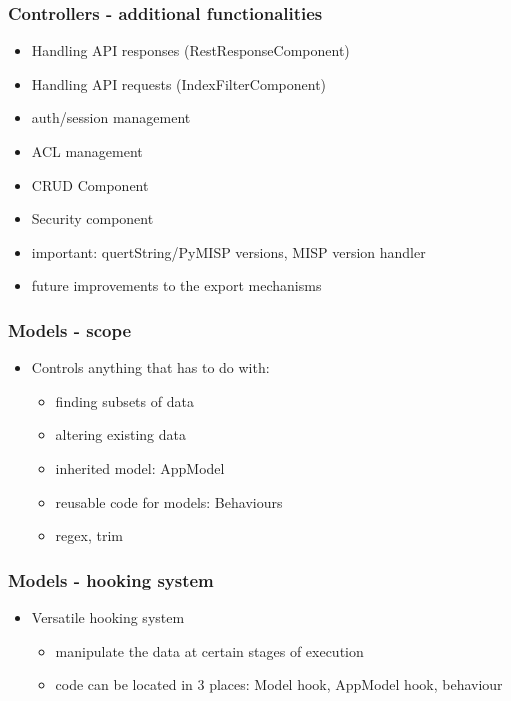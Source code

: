 \begin{frame}
  \frametitle{Controllers - additional functionalities}
  \begin{itemize}
    \item Handling API responses (RestResponseComponent)
    \item Handling API requests (IndexFilterComponent)
    \item auth/session management
    \item ACL management
    \item CRUD Component
    \item Security component
    \item important: quertString/PyMISP versions, MISP version handler
    \item future improvements to the export mechanisms
  \end{itemize}
\end{frame}

\begin{frame}
\frametitle{Models - scope}
\begin{itemize}
  \item Controls anything that has to do with:
    \begin{itemize}
    \item finding subsets of data
    \item altering existing data
    \item inherited model: AppModel
    \item reusable code for models: Behaviours
    \item regex, trim
    \end{itemize}
  \end{itemize}
\end{frame}

\begin{frame}
\frametitle{Models - hooking system}
  \begin{itemize}
    \item Versatile hooking system
    \begin{itemize}
      \item manipulate the data at certain stages of execution
      \item code can be located in 3 places: Model hook, AppModel hook, behaviour
    \end{itemize}
  \end{itemize}
\end{frame}


